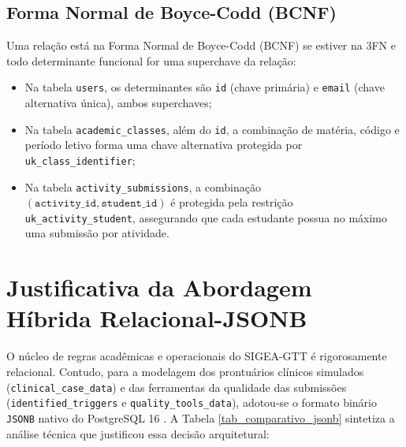 \subsection{Forma Normal de Boyce-Codd (BCNF)}
Uma relação está na Forma Normal de Boyce-Codd (BCNF) se estiver na 3FN e todo determinante funcional for uma superchave da relação:
\begin{itemize}
    \item Na tabela \texttt{users}, os determinantes são \texttt{id} (chave primária) e \texttt{email} (chave alternativa única), ambos superchaves;
    \item Na tabela \texttt{academic\_classes}, além do \texttt{id}, a combinação de matéria, código e período letivo forma uma chave alternativa protegida por \texttt{uk\_class\_identifier};
    \item Na tabela \texttt{activity\_submissions}, a combinação $(\texttt{activity\_id}, \texttt{student\_id})$ é protegida pela restrição \texttt{uk\_activity\_student}, assegurando que cada estudante possua no máximo uma submissão por atividade.
\end{itemize}

\section{Justificativa da Abordagem Híbrida Relacional-JSONB}
\label{sec_justificativa_jsonb}

O núcleo de regras acadêmicas e operacionais do SIGEA-GTT é rigorosamente relacional. Contudo, para a modelagem dos prontuários clínicos simulados (\texttt{clinical\_case\_data}) e das ferramentas da qualidade das submissões (\texttt{identified\_triggers} e \texttt{quality\_tools\_data}), adotou-se o formato binário \texttt{JSONB} nativo do PostgreSQL 16 \cite{postgresql2024}. A Tabela \ref{tab_comparativo_jsonb} sintetiza a análise técnica que justificou essa decisão arquitetural:

